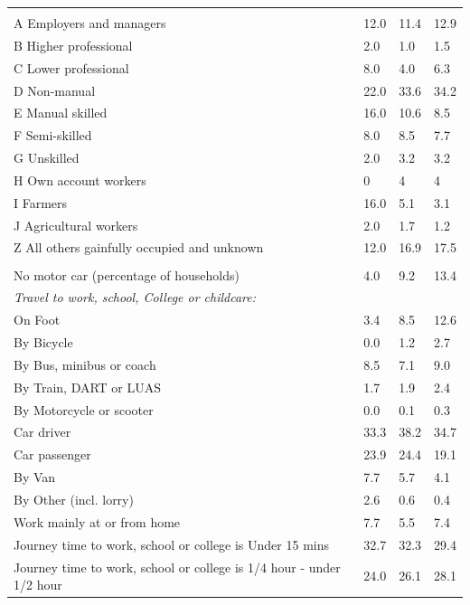 \documentclass{article}
\begin{document}
\begin{table}[h]
\begin{tabular}{KTTT}
\hline
    \\ 
    \hline
A Employers and managers & 12.0& 11.4& 12.9\\
B Higher professional & 2.0& 1.0& 1.5\\
C Lower professional & 8.0& 4.0& 6.3\\
D Non-manual & 22.0& 33.6& 34.2\\
E Manual skilled & 16.0& 10.6&  8.5\\
F Semi-skilled & 8.0& 8.5& 7.7\\
G Unskilled & 2.0& 3.2& 3.2\\
H Own account workers & 0& 4& 4\\
I Farmers & 16.0&  5.1&  3.1\\
J Agricultural workers & 2.0& 1.7& 1.2\\
Z All others gainfully occupied and unknown & 12.0& 16.9& 17.5\\
\hline
{}\hline
    \\ 
    \hline
No motor car (percentage of households) &  4.0&  9.2& 
13.4\\
    \hline
\emph{Travel to work, school, College or childcare:} & & & \\
\quad On Foot &  3.4&  8.5& 12.6\\
\quad By Bicycle & 0.0& 1.2& 2.7\\
\quad By Bus, minibus or coach & 8.5& 7.1& 9.0\\
\quad By Train, DART or LUAS & 1.7& 1.9& 2.4\\
\quad By Motorcycle or scooter & 0.0& 0.1& 0.3\\
\quad Car driver & 33.3& 38.2& 34.7\\
\quad Car passenger & 23.9& 24.4& 19.1\\
\quad By Van & 7.7& 5.7& 4.1\\
\quad By Other (incl. lorry) & 2.6& 0.6& 0.4\\
    \hline
Work mainly at or from home & 7.7& 5.5& 7.4\\
Journey time to work, school or college is Under 15 mins & 32.7& 32.3& 29.4\\
Journey time to work, school or college is 1/4 hour - under 1/2 hour & 24.0& 26.1& 28.1\\

\end{tabular}
\end{table}
\end{document}
